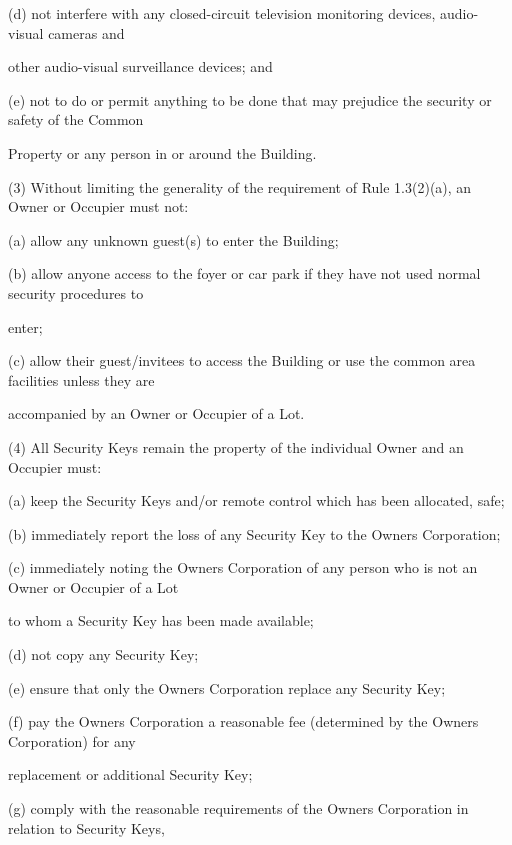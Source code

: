 \documentclass{article}
\begin{document}
{\fontsize{9.962}{1}(d) not interfere with any closed-circuit television monitoring devices, audio-visual cameras and }

{\fontsize{10.02}{1}other audio-visual surveillance devices; and }

{\fontsize{9.962}{1}(e) not to do or permit anything to be done that may prejudice the security or safety of the Common }

{\fontsize{10.02}{1}Property or any person in or around the Building. }

{\fontsize{9.962}{1}(3) Without limiting the generality of the requirement of Rule 1.3(2)(a), an Owner or Occupier must not: }

{\fontsize{9.962}{1}(a) allow any unknown guest(s) to enter the Building; }

{\fontsize{9.962}{1}(b) allow anyone access to the foyer or car park if they have not used normal security procedures to }

{\fontsize{10.02}{1}enter; }

{\fontsize{9.962}{1}(c) allow their guest/invitees to access the Building or use the common area facilities unless they are }

{\fontsize{10.02}{1}accompanied by an Owner or Occupier of a Lot. }

{\fontsize{9.962}{1}(4) All Security Keys remain the property of the individual Owner and an Occupier must: }

{\fontsize{9.962}{1}(a) keep the Security Keys and/or remote control which has been allocated, safe; }

{\fontsize{9.962}{1}(b) immediately report the loss of any Security Key to the Owners Corporation; }

{\fontsize{9.962}{1}(c) immediately noting the Owners Corporation of any person who is not an Owner or Occupier of a Lot }

{\fontsize{10.02}{1}to whom a Security Key has been made available; }

{\fontsize{9.962}{1}(d) not copy any Security Key; }

{\fontsize{9.962}{1}(e) ensure that only the Owners Corporation replace any Security Key; }

{\fontsize{9.962}{1}(f) pay the Owners Corporation a reasonable fee (determined by the Owners Corporation) for any }

{\fontsize{10.02}{1}replacement or additional Security Key; }

{\fontsize{9.962}{1}(g) comply with the reasonable requirements of the Owners Corporation in relation to Security Keys, }
\end{document}
